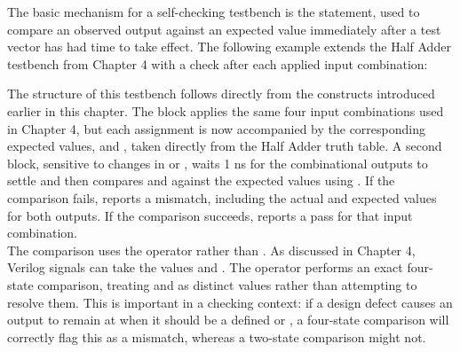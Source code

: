 \noindent The basic mechanism for a self-checking testbench is the  statement, used to compare an observed output against an expected value immediately after a test vector has had time to take effect. The following example extends the Half Adder testbench from Chapter 4 with a check after each applied input combination:


The structure of this testbench follows directly from the constructs introduced earlier in this chapter. The  block applies the same four input combinations used in Chapter 4, but each assignment is now accompanied by the corresponding expected values,  and , taken directly from the Half Adder truth table. A second block, sensitive to changes in  or , waits 1 ns for the combinational outputs to settle and then compares  and  against the expected values using . If the comparison fails,  reports a mismatch, including the actual and expected values for both outputs. If the comparison succeeds,  reports a pass for that input combination.\\


\noindent The comparison uses the \inlinecode{!==} operator rather than \inlinecode{!=}. As discussed in Chapter 4, Verilog signals can take the values  and . The \inlinecode{!==} operator performs an exact four-state comparison, treating  and  as distinct values rather than attempting to resolve them. This is important in a checking context: if a design defect causes an output to remain at  when it should be a defined  or , a four-state comparison will correctly flag this as a mismatch, whereas a two-state comparison might not. \\


